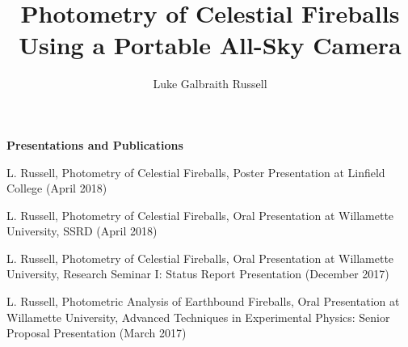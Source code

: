 \documentclass[12pt]{report}
\begin{document}
\title{Photometry of Celestial Fireballs Using a Portable All-Sky Camera}
\author{Luke Galbraith Russell}

\maketitle


\newpage

\begin{center}
\textbf{Presentations and Publications}

L. Russell, Photometry of Celestial Fireballs, Poster Presentation at Linfield College (April 2018)
\bigskip

L. Russell, Photometry of Celestial Fireballs, Oral Presentation at Willamette University, SSRD (April 2018)
\bigskip

L. Russell, Photometry of Celestial Fireballs, Oral Presentation at Willamette University, Research Seminar I: Status Report Presentation (December 2017)
\bigskip

L. Russell, Photometric Analysis of Earthbound Fireballs, Oral Presentation at Willamette University, Advanced Techniques in Experimental Physics: Senior Proposal Presentation (March 2017)
\bigskip
\end{center}



\begin{acknowledgments}

\end{acknowledgments}

\begin{abstract}

\end{abstract}

\tableofcontents
\listoffigures








%



\appendix
%
\end{document}
